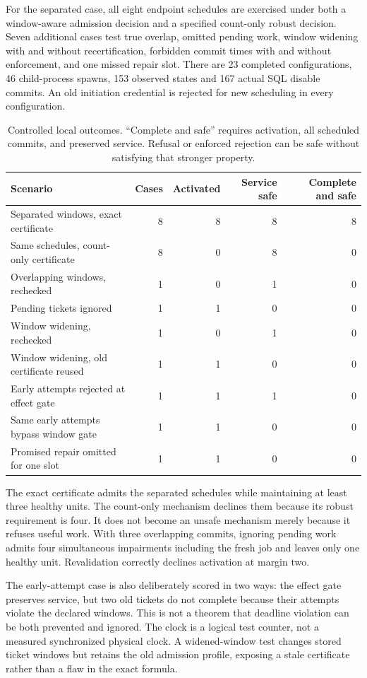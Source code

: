 \documentclass[11pt,a4paper]{article}
\theoremstyle{definition}\newtheorem{definition}{Definition}
\begin{document}
For the separated case, all eight endpoint schedules are exercised under both a window-aware admission decision and a specified count-only robust decision. Seven additional cases test true overlap, omitted pending work, window widening with and without recertification, forbidden commit times with and without enforcement, and one missed repair slot. There are 23 completed configurations, 46 child-process spawns, 153 observed states and 167 actual SQL disable commits. An old initiation credential is rejected for new scheduling in every configuration.

\begin{table}[t]
\centering\small
\caption{Controlled local outcomes. ``Complete and safe'' requires activation, all scheduled commits, and preserved service. Refusal or enforced rejection can be safe without satisfying that stronger property.}
\label{tab:protocol}
\begin{tabularx}{\linewidth}{@{}Xrrrr@{}}\toprule
Scenario & Cases & Activated & Service safe & Complete and safe\\\midrule
Separated windows, exact certificate &8&8&8&8\\
Same schedules, count-only certificate &8&0&8&0\\
Overlapping windows, rechecked &1&0&1&0\\
Pending tickets ignored &1&1&0&0\\
Window widening, rechecked &1&0&1&0\\
Window widening, old certificate reused &1&1&0&0\\
Early attempts rejected at effect gate &1&1&1&0\\
Same early attempts bypass window gate &1&1&0&0\\
Promised repair omitted for one slot &1&1&0&0\\\bottomrule
\end{tabularx}
\end{table}
The exact certificate admits the separated schedules while maintaining at least three healthy units. The count-only mechanism declines them because its robust requirement is four. It does not become an unsafe mechanism merely because it refuses useful work. With three overlapping commits, ignoring pending work admits four simultaneous impairments including the fresh job and leaves only one healthy unit. Revalidation correctly declines activation at margin two.

The early-attempt case is also deliberately scored in two ways: the effect gate preserves service, but two old tickets do not complete because their attempts violate the declared windows. This is not a theorem that deadline violation can be both prevented and ignored. The clock is a logical test counter, not a measured synchronized physical clock. A widened-window test changes stored ticket windows but retains the old admission profile, exposing a stale certificate rather than a flaw in the exact formula.
\end{document}
